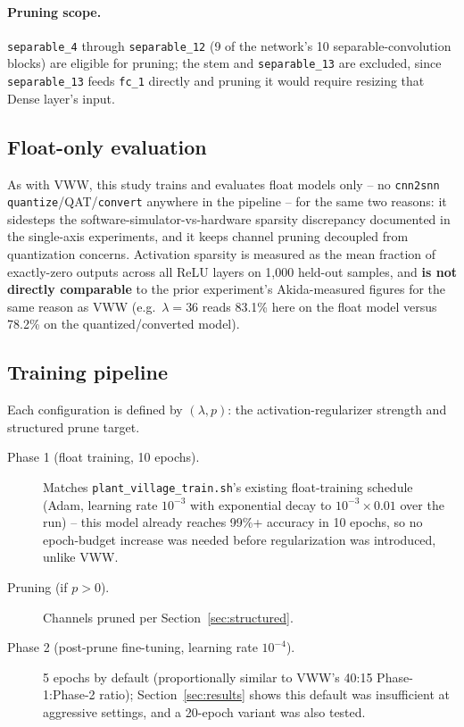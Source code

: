 \documentclass[11pt]{article}
\newcommand{\code}[1]{\texttt{#1}}
\begin{document}
\paragraph{Pruning scope.} \code{separable\_4} through \code{separable\_12} (9 of the network's 10 separable-convolution blocks) are eligible for pruning; the stem and \code{separable\_13} are excluded, since \code{separable\_13} feeds \code{fc\_1} directly and pruning it would require resizing that Dense layer's input.

\subsection{Float-only evaluation}

As with VWW, this study trains and evaluates float models only -- no \code{cnn2snn quantize}/QAT/\code{convert} anywhere in the pipeline -- for the same two reasons: it sidesteps the software-simulator-vs-hardware sparsity discrepancy documented in the single-axis experiments, and it keeps channel pruning decoupled from quantization concerns. Activation sparsity is measured as the mean fraction of exactly-zero outputs across all ReLU layers on 1{,}000 held-out samples, and \textbf{is not directly comparable} to the prior experiment's Akida-measured figures for the same reason as VWW (e.g.\ $\lambda=36$ reads 83.1\% here on the float model versus 78.2\% on the quantized/converted model).

\subsection{Training pipeline}

Each configuration is defined by $(\lambda, p)$: the activation-regularizer strength and structured prune target.

\begin{description}
    \item[Phase 1 (float training, 10 epochs).] Matches \code{plant\_village\_train.sh}'s existing float-training schedule (Adam, learning rate $10^{-3}$ with exponential decay to $10^{-3}\times0.01$ over the run) -- this model already reaches 99\%+ accuracy in 10 epochs, so no epoch-budget increase was needed before regularization was introduced, unlike VWW.
    \item[Pruning (if $p>0$).] Channels pruned per Section~\ref{sec:structured}.
    \item[Phase 2 (post-prune fine-tuning, learning rate $10^{-4}$).] 5 epochs by default (proportionally similar to VWW's 40:15 Phase-1:Phase-2 ratio); Section~\ref{sec:results} shows this default was insufficient at aggressive settings, and a 20-epoch variant was also tested.
\end{description}
\end{document}

